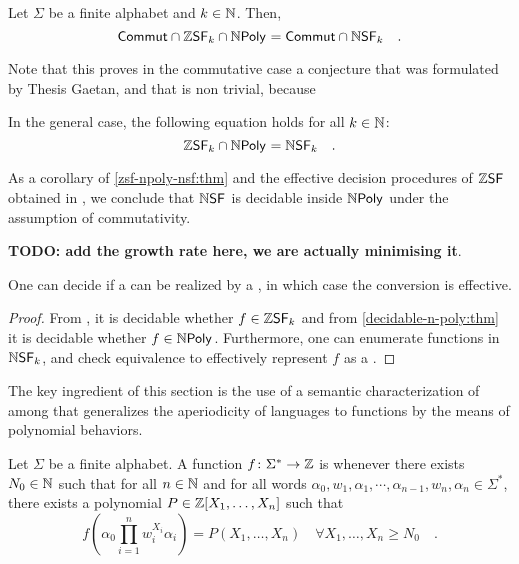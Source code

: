 \begin{theorem}
    \label{zsf-npoly-nsf:thm}
    Let $\Sigma$ be a finite alphabet and $k \in \mathbb{N}$.
    Then,
    \begin{equation*}
        \ZCommut \cap \ZSF[k] \cap \NPoly
        = \ZCommut \cap \NSF[k]
        \quad .
    \end{equation*}
\end{theorem}

Note that this proves in the commutative case a conjecture that was 
formulated by Thesis Gaetan, and that is non trivial, because 

\begin{conjecture}
    \label{nsf-zsf:conj}
    In the general case, the following equation holds for all $k \in \mathbb{N}$:
    \begin{equation*}
        \ZSF[k] \cap \NPoly
        = 
        \NSF[k]
        \quad .
    \end{equation*}
\end{conjecture}

As a corollary of \cref{zsf-npoly-nsf:thm} and the effective decision
procedures of $\ZSF$ obtained in \cite{LOPEZ23b}, we conclude that $\NSF$ is
decidable inside $\NPoly$ under the assumption of commutativity.

\textbf{TODO: add the growth rate here, we are actually minimising it}.
\begin{corollary}
    One can decide if a  
    can be realized by a ,
    in which case the conversion is effective.
\end{corollary}
\begin{proof}
    From \cite[Theorem V.13]{LOPEZ23b}, it is decidable whether
    $f \in \ZSF[k]$ and from \cref{decidable-n-poly:thm}
    it is decidable whether $f \in \NPoly$.
    Furthermore, one can enumerate functions in $\NSF[k]$,
    and check equivalence to effectively represent $f$ as a
    .
\end{proof}

The key ingredient of this section is the use of a semantic characterization of
 among 
that generalizes the aperiodicity of languages to functions by the means of
polynomial behaviors.

\begin{definition}
    \label{ultimately-polynomial:def}
    Let $\Sigma$ be a finite alphabet. 
    A function $f \colon \Sigma^* \to \mathbb{Z}$
    is 
    whenever there exists $N_0 \in \mathbb{N}$ such that
    for all $n \in \mathbb{N}$
    and for all words $\alpha_0, w_1, \alpha_1, \cdots, \alpha_{n-1}, w_n, \alpha_n
    \in \Sigma^*$, there exists a polynomial $P \in \mathbb{Z}[X_1, \dots, X_n]$
    such that
    \begin{equation*}
        f\left(
            \alpha_0 \prod_{i = 1}^{n} w_i^{X_i} \alpha_i
        \right)
        = 
        P(X_1, \dots, X_n)
        \quad 
        \forall X_1, \dots, X_n \geq N_0
        \quad .
    \end{equation*}
\end{definition}


